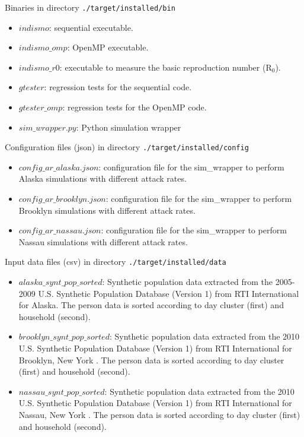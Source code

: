 \begin{compactitem}
    \item Binaries 
    in directory \texttt{./target/installed/bin}
      	\begin{itemize}
        		\item $indismo$: sequential executable.
        		\item $indismo\_omp$: OpenMP executable.
        		\item $indismo\_r0$: executable to measure the basic reproduction number (R$_{0}$).
		\item $gtester$: regression tests for the sequential code.
        		\item $gtester\_omp$: regression tests for the OpenMP code.
        		\item $sim\_wrapper.py$: Python simulation wrapper  		
        \end{itemize}
    \item Configuration files (json)
      in directory \texttt{./target/installed/config}
      	\begin{itemize}
        		\item $config\_ar\_alaska.json$: configuration file for the sim\_wrapper to perform Alaska simulations with different attack rates.
		\item $config\_ar\_brooklyn.json$: configuration file for the sim\_wrapper to perform Brooklyn simulations with different attack rates.
        		\item $config\_ar\_nassau.json$: configuration file for the sim\_wrapper to perform Nassau simulations with different attack rates.
        \end{itemize}
    \item Input data files (csv)
      in directory \texttt{./target/installed/data}
      	\begin{itemize}
        		 \item $alaska\_synt\_pop\_sorted$: Synthetic population data extracted from the 2005-2009 U.S. Synthetic Population Database (Version 1) from RTI International for Alaska. The person data is sorted according to day cluster (first) and household (second).
		 \item $brooklyn\_synt\_pop\_sorted$: Synthetic population data extracted from the 2010 U.S. Synthetic Population Database (Version 1) from RTI International for Brooklyn, New York \cite{wheaton2014a,wheaton2014b}. The person data is sorted according to day cluster (first) and household (second).
       		 \item $nassau\_synt\_pop\_sorted$: Synthetic population data extracted from the 2010 U.S. Synthetic Population Database (Version 1) from RTI International for Nassau, New York \cite{wheaton2014a,wheaton2014b}. The person data is sorted according to day cluster (first) and household (second).

\end{itemize}
\end{compactitem}
